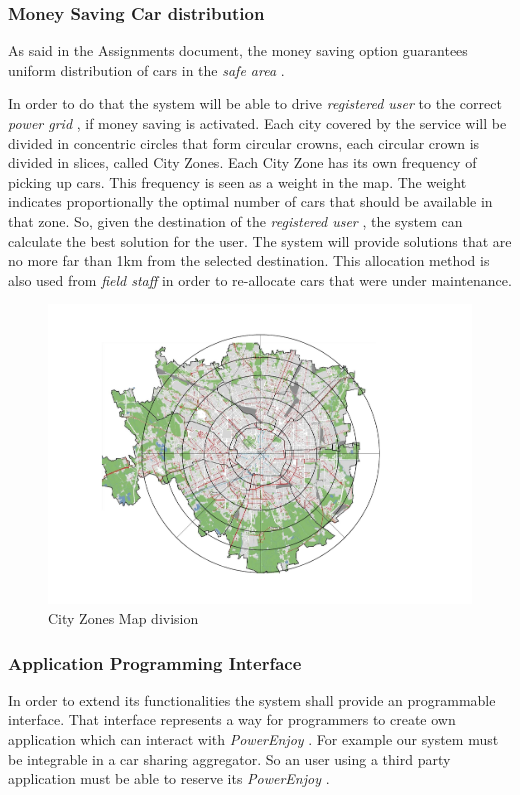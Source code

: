 \documentclass[english]{article}
\newcommand{\powerenjoy}{\textit{PowerEnjoy }}
\newcommand{\registereduser}{\textit {registered user }}
\newcommand{\safearea}{\textit{safe area }}
\newcommand{\powergrid}{\textit{power grid }}
\newcommand{\fieldstaff}{\textit{field staff }}
\begin{document}
		\subsubsection{Money Saving Car distribution}
		As said in the Assignments document, the money saving option guarantees uniform distribution of cars in the \safearea.\par In order to do that the system will be able to drive \registereduser to the correct \powergrid, if money saving is activated. Each city covered by the service will be divided in concentric circles that form circular crowns, each circular crown is divided in slices, called City Zones. Each City Zone has its own frequency of picking up cars. This frequency is seen as a weight in the map. The weight indicates proportionally the optimal number of cars that should be available in that zone. So, given the destination of the \registereduser, the system can calculate the best solution for the user.
The system will provide solutions that are no more far than 1km from the selected destination.
This allocation method is also used from \fieldstaff in order to re-allocate cars that were under maintenance.
		\noindent
		\begin{figure}[H]
\centering
\includegraphics[scale=0.4]{mappazone.pdf}%

\caption{City Zones Map division}
\end{figure}
		

		

		\subsubsection{Application Programming Interface}
		In order to extend its functionalities the system shall provide an programmable interface. That interface represents a way for programmers to create own application which can interact with \powerenjoy. For example our system must be integrable in a car sharing aggregator. So an user using a third party application must be able to reserve its \powerenjoy.
		
\end{document}
